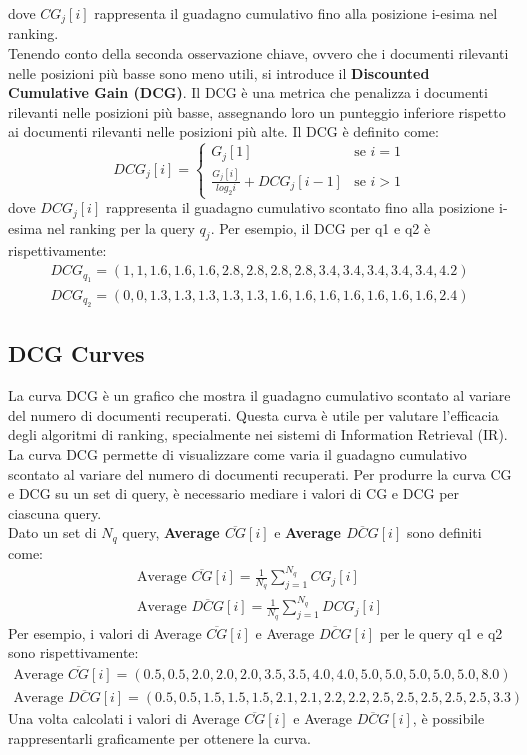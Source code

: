 \documentclass{report}
\begin{document}
	dove $CG_j[i]$ rappresenta il guadagno cumulativo fino alla posizione i-esima nel ranking.
	\vspace{\baselineskip}\\
	Tenendo conto della seconda osservazione chiave, ovvero che i documenti rilevanti nelle posizioni più basse sono meno utili, si introduce il \textbf{Discounted Cumulative Gain (DCG)}. Il DCG è una metrica che penalizza i documenti rilevanti nelle posizioni più basse, assegnando loro un punteggio inferiore rispetto ai documenti rilevanti nelle posizioni più alte. Il DCG è definito come:
	\[
		DCG_j[i] =
		\begin{cases}
		  G_j[1] & \text{se } i = 1\\
		  \frac{G_j[i]}{log_2i} + DCG_j[i-1] & \text{se } i > 1
		\end{cases}
	\]
	dove $DCG_j[i]$ rappresenta il guadagno cumulativo scontato fino alla posizione i-esima nel ranking per la query $q_j$.
	Per esempio, il DCG per q1 e q2 è rispettivamente:
	\[
		\begin{array}{l}
			DCG_{q_1} = (1,1,1.6,1.6,1.6,2.8,2.8,2.8,2.8,3.4,3.4,3.4,3.4,3.4,4.2)\\
			DCG_{q_2} = (0,0,1.3,1.3,1.3,1.3,1.3,1.6,1.6,1.6,1.6,1.6,1.6,1.6,2.4)
		\end{array}
	\]
	\subsection{DCG Curves}
	La curva DCG è un grafico che mostra il guadagno cumulativo scontato al variare del numero di documenti recuperati. Questa curva è utile per valutare l'efficacia degli algoritmi di ranking, specialmente nei sistemi di Information Retrieval (IR). La curva DCG permette di visualizzare come varia il guadagno cumulativo scontato al variare del numero di documenti recuperati. Per produrre la curva CG e DCG su un set di query, è necessario mediare i valori di CG e DCG per ciascuna query.
	\vspace{\baselineskip}\\
	Dato un set di $N_q$ query, \textbf{Average $\overline{CG}[i]$} e \textbf{Average $\overline{DCG}[i]$} sono definiti come:
	\[
		\begin{array}{l}
			\text{Average } \overline{CG}[i] = \frac{1}{N_q} \sum_{j=1}^{N_q} CG_j[i] \\
			\text{Average } \overline{DCG}[i] = \frac{1}{N_q} \sum_{j=1}^{N_q} DCG_j[i]
		\end{array}
	\]
	Per esempio, i valori di Average $\overline{CG}[i]$ e Average $\overline{DCG}[i]$ per le query q1 e q2 sono rispettivamente:
	\[
		\begin{array}{l}
			\text{Average } \overline{CG}[i] = (0.5, 0.5, 2.0, 2.0, 2.0, 3.5, 3.5, 4.0, 4.0, 5.0, 5.0, 5.0, 5.0, 5.0, 8.0)\\
			\text{Average } \overline{DCG}[i] = (0.5, 0.5, 1.5, 1.5, 1.5, 2.1, 2.1, 2.2, 2.2, 2.5, 2.5, 2.5, 2.5, 2.5, 3.3)
		\end{array}
	\]
	Una volta calcolati i valori di Average $\overline{CG}[i]$ e Average $\overline{DCG}[i]$, è possibile rappresentarli graficamente per ottenere la curva.
\end{document}
